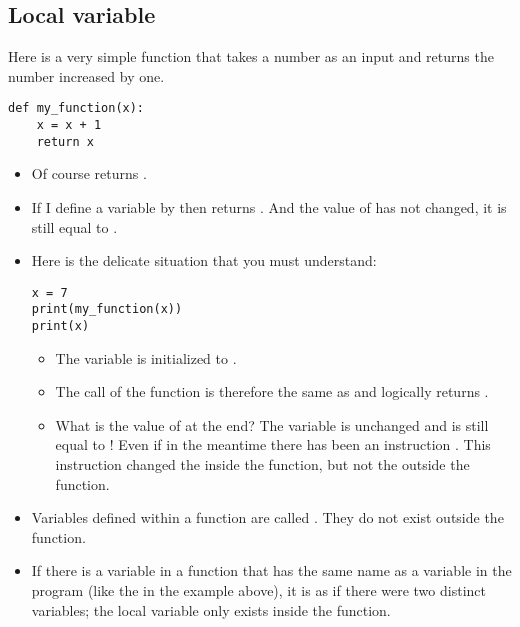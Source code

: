 \documentclass[11pt,class=report,crop=false]{standalone}
\begin{document}
\subsection{Local variable}

Here is a very simple function that takes a number as an input and returns the number increased by one.
\begin{center}
\begin{lstlisting}
def my_function(x):
    x = x + 1
    return x
\end{lstlisting}
\end{center}

\begin{itemize}
  \item Of course  returns .
  
  \item If I define a variable by  then  returns . And the value of  has not changed, it is still equal to .
  
  \item Here is the delicate situation that you must understand:
\begin{center}
\begin{lstlisting}
x = 7
print(my_function(x))
print(x)
\end{lstlisting}
\end{center}
  \begin{itemize}
    \item The variable  is initialized to .
    
    \item The call of the function  is therefore the same as 
      and logically returns .
     
    
    \item What is the value of  at the end? The variable  is unchanged and is still equal to ! Even if in the meantime there has been an instruction . This instruction changed the  inside the function, but not the  outside the function.
\end{itemize}   
\end{itemize} 
 
\bigskip

\begin{itemize}
  \item Variables defined within a function are called 
. 
They do not exist outside the function.
  
  \item If there is a variable in a function that has the same name as a variable in the program (like the  in the example above), it is as if there were two distinct variables; the local variable only exists inside the function.
  
\end{itemize}
\end{document}
